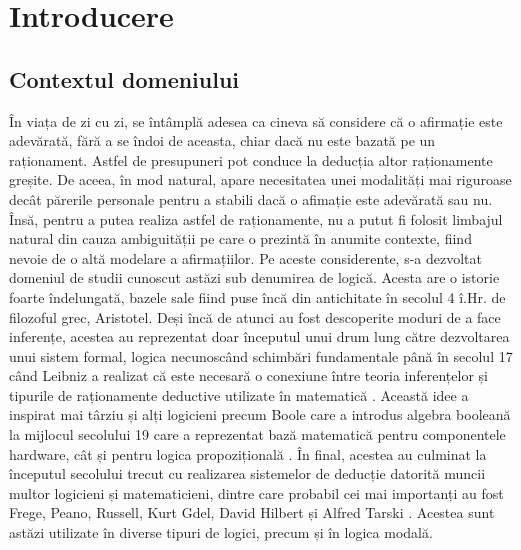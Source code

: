 \documentclass[12pt, openany]{book}
\begin{document}
    \clearpage

    \begingroup
        \let\cleardoublepage\clearpage
        \tableofcontents
        \thispagestyle{empty}
    \endgroup

    
    
    \pagestyle{plain}

    \chapter{Introducere} %
    \label{chapter_introduction}
        \section{Contextul domeniului} %
        \label{section_context}
            \par{}
                În viața de zi cu zi, se întâmplă adesea ca cineva să considere că o afirmație este adevărată, fără a se 
                îndoi de aceasta, chiar dacă nu este bazată pe un raționament. Astfel de presupuneri pot conduce la 
                deducția altor raționamente greșite. De aceea, în mod natural, apare necesitatea unei modalități mai 
                riguroase decât părerile personale pentru a stabili dacă o afimație este adevărată sau nu. Însă, pentru 
                a putea realiza astfel de raționamente, nu a putut fi folosit limbajul natural din cauza ambiguității pe 
                care o prezintă în anumite contexte, fiind nevoie de o altă modelare a afirmațiilor. Pe aceste 
                considerente, s-a dezvoltat domeniul de studii cunoscut astăzi sub denumirea de logică. Acesta are o 
                istorie foarte îndelungată, bazele sale fiind puse încă din antichitate în secolul 4 î.Hr. de filozoful 
                grec, Aristotel. Deși încă de atunci au fost descoperite moduri de a face inferențe, acestea 
                au reprezentat doar începutul unui drum lung către dezvoltarea unui sistem formal, logica necunoscând 
                schimbări fundamentale până în secolul 17 când Leibniz a realizat că este necesară o conexiune între 
                teoria inferențelor și tipurile de raționamente deductive utilizate în matematică 
                \cite{introduction_to_logic}. Această idee a inspirat mai târziu și alți logicieni precum Boole care a 
                introdus algebra booleană la mijlocul secolului 19 care a reprezentat bază matematică pentru 
                componentele hardware, cât și pentru logica propozițională \cite{logic_computer_science}. În final, 
                acestea au culminat la începutul secolului trecut cu realizarea sistemelor de deducție datorită muncii 
                multor logicieni și matematicieni, dintre care probabil cei mai importanți au fost Frege, Peano, 
                Russell, Kurt Gdel, David Hilbert și Alfred Tarski \cite{introduction_to_logic}. Acestea 
                sunt astăzi utilizate în diverse tipuri de logici, precum și în logica modală.
            
\end{document}
